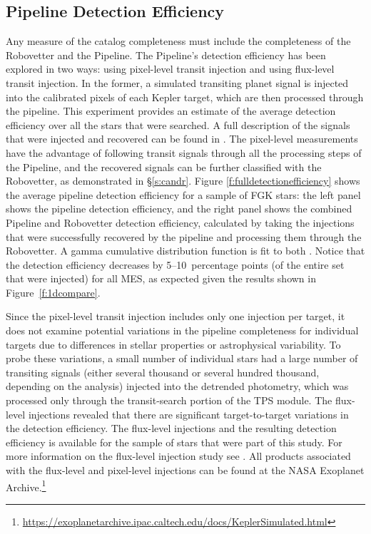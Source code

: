 \subsection{Pipeline Detection Efficiency}

Any measure of the catalog completeness must include the completeness of the Robovetter and the \Kepler{} Pipeline. The Pipeline's detection efficiency has been explored in two ways: using pixel-level transit injection and using flux-level transit injection. In the former, a simulated transiting planet signal is injected into the calibrated pixels of each Kepler target, which are then processed through the pipeline. This experiment provides an estimate of the average detection efficiency over all the stars that were searched. A full description of the signals that were injected and recovered can be found in \citet{Christiansen2017}. The pixel-level measurements have the advantage of following transit signals through all the processing steps of the \Kepler{} Pipeline, and the recovered signals can be further classified with the Robovetter, as demonstrated in \S\ref{s:candr}. Figure \ref{f:fulldetectionefficiency} shows the average pipeline detection efficiency for a sample of FGK stars: the left panel shows the pipeline detection efficiency, and the right panel shows the combined Pipeline and Robovetter detection efficiency, calculated by taking the injections that were successfully recovered by the pipeline and processing them through the Robovetter. A gamma cumulative distribution function is fit to both \citep[see equation 1 of ][]{Christiansen2016}.  Notice that the detection efficiency decreases by 5--10~percentage points (of the entire set that were injected) for all MES, as expected given the results shown in Figure~\ref{f:1dcompare}. 



Since the pixel-level transit injection includes only one injection per target, it does not examine potential variations in the pipeline completeness for individual targets due to differences in stellar properties or astrophysical variability. To probe these variations, a small number of individual stars had a large number of transiting signals (either several thousand or several hundred thousand, depending on the analysis) injected into the detrended photometry, which was processed only through the transit-search portion of the TPS module. The flux-level injections revealed that there are significant target-to-target variations in the detection efficiency. The flux-level injections and the resulting detection efficiency is available for the sample of stars that were part of this study. For more information on the flux-level injection study see \citet{Burke2017c}. All products associated with the flux-level and pixel-level injections can be found at the NASA Exoplanet Archive.\footnote{\url{https://exoplanetarchive.ipac.caltech.edu/docs/KeplerSimulated.html}}


